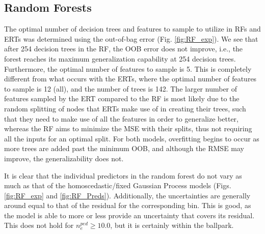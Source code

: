 \documentclass[a4paper, twoside, final, 12pt]{article}
\begin{document}
{\subsection{Random Forests}

The optimal number of decision trees and features to sample to utilize in RFs and ERTs was determined using the out-of-bag error (Fig. \ref{fig:RF_exp}). We see that after 254 decision trees in the RF, the OOB error does not improve, i.e., the forest reaches its maximum generalization capability at 254 decision trees. Furthermore, the optimal number of features to sample is 5. This is completely different from what occurs with the ERTs, where the optimal number of features to sample is 12 (all), and the number of trees is 142. The larger number of features sampled by the ERT compared to the RF is most likely due to the random splitting of nodes that ERTs make use of in creating their trees, such that they need to make use of all the features in order to generalize better, whereas the RF aims to minimize the MSE with their splits, thus not requiring all the inputs for an optimal split. For both models, overfitting begins to occur as more trees are added past the minimum OOB, and although the RMSE may improve, the generalizability does not.


It is clear that the individual predictors in the random forest do not vary as much as that of the homoscedastic/fixed Gaussian Process models (Figs. \ref{fig:RF_exp} and \ref{fig:RF_Preds}).
Additionally, the uncertainties are generally around equal to that of the residual for the corresponding bin. This is good, as the model is able to more or less provide an uncertainty that covers its residual. This does not hold for $n_e^{ped} \geq 10.0$, but it is certainly within the ballpark. 

}
\end{document}

